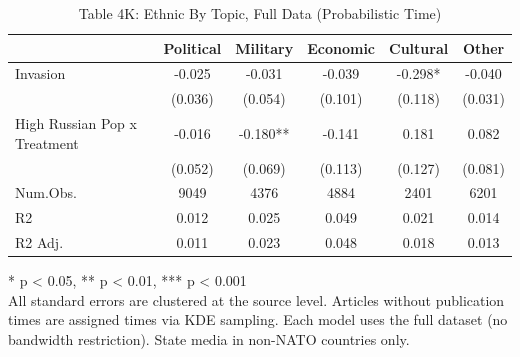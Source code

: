 \begin{table}[!t]
\caption{Table 4K: Ethnic By Topic, Full Data (Probabilistic Time)} 
\fontsize{12.0pt}{14.4pt}\selectfont
\begin{tabular*}{\linewidth}{@{\extracolsep{\fill}}lccccc}
\toprule
  & Political & Military & Economic & Cultural & Other \\ 
\midrule\addlinespace[2.5pt]
Invasion & -0.025 & -0.031 & -0.039 & -0.298* & -0.040 \\ 
 & (0.036) & (0.054) & (0.101) & (0.118) & (0.031) \\ 
High Russian Pop x Treatment & -0.016 & -0.180** & -0.141 & 0.181 & 0.082 \\ 
{} & {(0.052)} & {(0.069)} & {(0.113)} & {(0.127)} & {(0.081)} \\ 
Num.Obs. & 9049 & 4376 & 4884 & 2401 & 6201 \\ 
R2 & 0.012 & 0.025 & 0.049 & 0.021 & 0.014 \\ 
R2 Adj. & 0.011 & 0.023 & 0.048 & 0.018 & 0.013 \\ 
\bottomrule
\end{tabular*}
\begin{minipage}{\linewidth}
* p < 0.05, ** p < 0.01, *** p < 0.001\\
All standard errors are clustered at the source level. Articles without
publication times are assigned times via KDE sampling. Each model uses the full
dataset (no bandwidth restriction). State media in non-NATO countries only.\\
\end{minipage}
\end{table}

